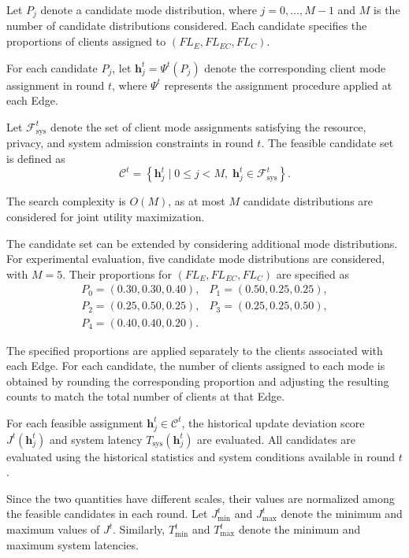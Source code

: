 \documentclass[5p,times]{elsarticle}
\theoremstyle{plain}
\theoremstyle{definition}
\theoremstyle{remark}
\begin{document}
	
	Let $P_j$ denote a candidate mode distribution,
	where $j=0,\ldots,M-1$ and $M$ is the number
	of candidate distributions considered.
	Each candidate specifies the proportions
	of clients assigned to $(FL_E,FL_{EC},FL_C)$.
	
	For each candidate $P_j$, let
	$\mathbf h_j^t=\Psi^t(P_j)$
	denote the corresponding client mode assignment
	in round $t$, where $\Psi^t$ represents
	the assignment procedure applied at each Edge.
	
	
	Let $\mathcal F_{\mathrm{sys}}^t$ denote the set
	of client mode assignments satisfying the
	resource, privacy, and system admission
	constraints in round $t$.
	The feasible candidate set is defined as
	\begin{equation}
		\mathcal C^t
		=
		\left\{
		\mathbf h_j^t \mid
		0\leq j<M,\;
		\mathbf h_j^t\in\mathcal F_{\mathrm{sys}}^t
		\right\}.
		\label{eq:feasible_candidates}
	\end{equation}
	
	The search complexity is $O(M)$,
	as at most $M$ candidate distributions
	are considered for joint utility maximization.
	
	The candidate set can be extended by considering
	additional mode distributions.
	For experimental evaluation, five candidate
	mode distributions are considered, with $M=5$.
	Their proportions for $(FL_E,FL_{EC},FL_C)$
	are specified as
	\[
	\begin{array}{ll}
		P_0=(0.30,0.30,0.40), & P_1=(0.50,0.25,0.25),\\
		P_2=(0.25,0.50,0.25), & P_3=(0.25,0.25,0.50),\\
		P_4=(0.40,0.40,0.20). &
	\end{array}
	\]
	
	The specified proportions are applied separately
	to the clients associated with each Edge.
	For each candidate, the number of clients
	assigned to each mode is obtained by rounding
	the corresponding proportion and adjusting
	the resulting counts to match the total
	number of clients at that Edge.
	
	For each feasible assignment
	$\mathbf h_j^t\in\mathcal C^t$,
	the historical update deviation score
	$J^t(\mathbf h_j^t)$ and system latency
	$T_{\mathrm{sys}}(\mathbf h_j^t)$
	are evaluated.
	All candidates are evaluated using the
	historical statistics and system conditions
	available in round $t$.
	
	Since the two quantities have different scales,
	their values are normalized among the feasible
	candidates in each round.
	Let $J_{\min}^t$ and $J_{\max}^t$ denote the
	minimum and maximum values of $J^t$.
	Similarly, $T_{\min}^t$ and $T_{\max}^t$
	denote the minimum and maximum system latencies.
	
\end{document}
